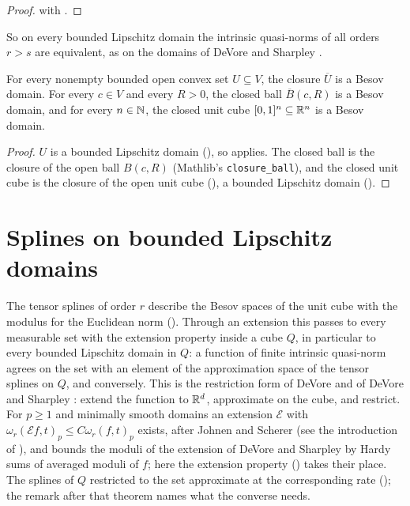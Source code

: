 \begin{proof}
\leanok
{} with .
\end{proof}

So on every bounded Lipschitz domain the intrinsic quasi-norms of all orders $r > s$ are
equivalent, as on the domains of DeVore and Sharpley \cite{DeVoreSharpley}.

\begin{corollary}
\label{cor:convex-besov-domain}
\leanok
{}
For every nonempty bounded open convex set $U \subseteq V$, the closure $\overline{U}$ is a Besov
domain. For every $c \in V$ and every $R > 0$, the closed ball $\overline{B}(c, R)$ is a Besov
domain, and for every $n \in \mathbb{N}$, the closed unit cube $[0, 1]^n \subseteq \mathbb{R}^n$ is a Besov
domain.
\end{corollary}

\begin{proof}
\leanok
$U$ is a bounded Lipschitz domain (), so
 applies. The closed ball is the closure of the open ball
$B(c, R)$ (Mathlib's \texttt{closure\_\allowbreak ball}), and the closed unit cube is the closure of
the open unit cube (), a bounded Lipschitz domain
().
\end{proof}

\section{Splines on bounded Lipschitz domains}
\label{sec:domain-splines}

The tensor splines of order $r$ describe the Besov spaces of the unit cube with the modulus for
the Euclidean norm (). Through an extension this passes to every
measurable set with the extension property inside a cube $Q$, in particular to every bounded
Lipschitz domain in $Q$: a function of finite intrinsic quasi-norm agrees on the set with an
element of the approximation space of the tensor splines on $Q$, and conversely. This is the
restriction form of DeVore \cite[\S 7.7]{DeVore1998} and of DeVore and Sharpley
\cite[\S 6]{DeVoreSharpley}: extend the function to $\mathbb{R}^d$, approximate on the cube, and restrict.
For $p \geq 1$ and minimally smooth domains an extension $\mathcal{E}$ with
$\omega_r(\mathcal{E} f, t)_p \leq C \omega_r(f, t)_p$ exists, after Johnen and Scherer
\cite{JohnenScherer1977} (see the introduction of \cite{DeVoreSharpley}), and
\cite[Theorem~6.6]{DeVoreSharpley} bounds the moduli of the extension of DeVore and Sharpley by
Hardy sums of averaged moduli of $f$; here the extension property
() takes their place. The splines of $Q$ restricted to
the set approximate at the corresponding rate (); the remark after
that theorem names what the converse needs.

